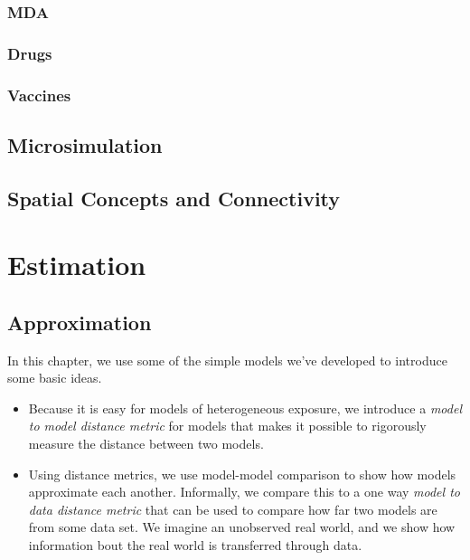 \documentclass[
]{book}
\begin{document}
\hypertarget{mda-1}{%
\section{MDA}\label{mda-1}}

\hypertarget{drugs-1}{%
\section{Drugs}\label{drugs-1}}

\hypertarget{vaccines-1}{%
\section{Vaccines}\label{vaccines-1}}

\hypertarget{microsimulation}{%
\chapter{Microsimulation}\label{microsimulation}}

\hypertarget{spatial-concepts-and-connectivity}{%
\chapter{Spatial Concepts and Connectivity}\label{spatial-concepts-and-connectivity}}

\hypertarget{part-estimation}{%
\part{Estimation}\label{part-estimation}}

\hypertarget{approximation}{%
\chapter{Approximation}\label{approximation}}

In this chapter, we use some of the simple models we've developed to introduce some basic ideas.

\begin{itemize}
\item
  Because it is easy for models of heterogeneous exposure, we introduce a \emph{model to model distance metric} for models that makes it possible to rigorously measure the distance between two models.
\item
  Using distance metrics, we use model-model comparison to show how models approximate each another. Informally, we compare this to a one way \emph{model to data distance metric} that can be used to compare how far two models are from some data set. We imagine an unobserved real world, and we show how information bout the real world is transferred through data.
\end{itemize}
\end{document}

